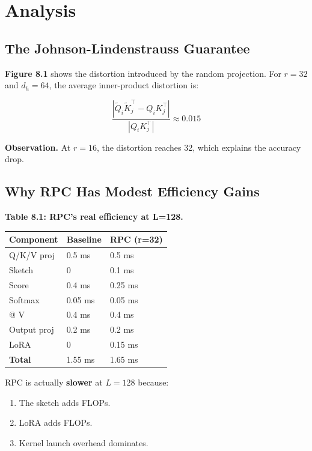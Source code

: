 
\section{Analysis}

\subsection{The Johnson-Lindenstrauss Guarantee}

\textbf{Figure 8.1} shows the distortion introduced by the random projection. 
For $r = 32$ and $d_h = 64$, the average inner-product distortion is:

\[
\frac{|\tilde{Q}_i \tilde{K}_j^\top - Q_i K_j^\top|}{|Q_i K_j^\top|} \approx 0.015
\]

\textbf{Observation.} At $r = 16$, the distortion reaches 32, 
which explains the accuracy drop.

\subsection{Why RPC Has Modest Efficiency Gains}

\textbf{Table 8.1: RPC's real efficiency at L=128.}

\begin{table}[H]
\centering
\small
\begin{tabular}{lll}
\toprule
\textbf{Component} & \textbf{Baseline} & \textbf{RPC (r=32)} \\
\midrule
Q/K/V proj & 0.5 ms & 0.5 ms \\
Sketch & 0 & 0.1 ms \\
Score & 0.4 ms & 0.25 ms \\
Softmax & 0.05 ms & 0.05 ms \\
@ V & 0.4 ms & 0.4 ms \\
Output proj & 0.2 ms & 0.2 ms \\
LoRA & 0 & 0.15 ms \\
\textbf{Total} & 1.55 ms & 1.65 ms \\
\bottomrule
\end{tabular}
\end{table}

RPC is actually \textbf{slower} at $L = 128$ because:
\begin{enumerate}
\item The sketch adds FLOPs.
\item LoRA adds FLOPs.
\item Kernel launch overhead dominates.

\end{enumerate}
